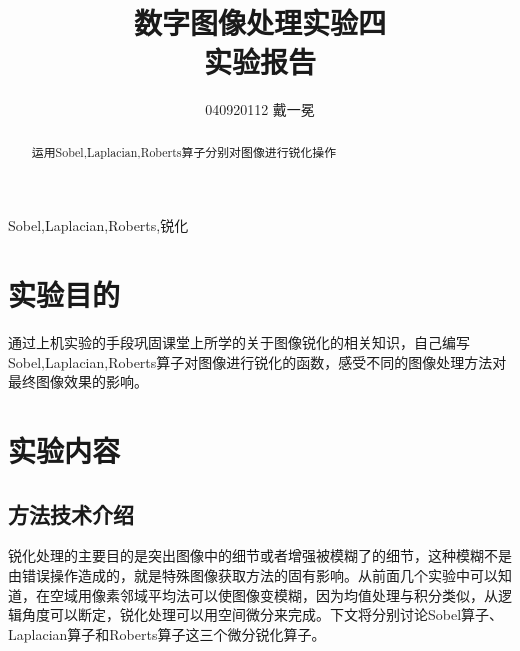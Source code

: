 \documentclass[]{IEEEphot}
\begin{document}
\title{数字图像处理实验四\\实验报告}
\author{040920112 戴一冕}
\maketitle
{}
\begin{abstract}
运用Sobel,Laplacian,Roberts算子分别对图像进行锐化操作 
\end{abstract}
\begin{IEEEkeywords}
Sobel,Laplacian,Roberts,锐化
\end{IEEEkeywords}
\section{实验目的}
通过上机实验的手段巩固课堂上所学的关于图像锐化的相关知识，自己编写Sobel,Laplacian,Roberts算子对图像进行锐化的函数，感受不同的图像处理方法对最终图像效果的影响。
\section{实验内容}
\subsection{方法技术介绍}
锐化处理的主要目的是突出图像中的细节或者增强被模糊了的细节，这种模糊不是由错误操作造成的，就是特殊图像获取方法的固有影响。从前面几个实验中可以知道，在空域用像素邻域平均法可以使图像变模糊，因为均值处理与积分类似，从逻辑角度可以断定，锐化处理可以用空间微分来完成。下文将分别讨论Sobel算子、Laplacian算子和Roberts算子这三个微分锐化算子。
\end{document}
